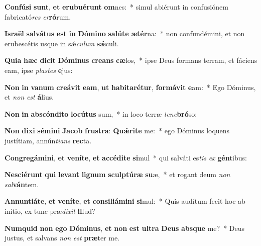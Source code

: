 \item \textbf{Con}\textbf{fú}\textbf{si} \textbf{sunt}, \textbf{et} \textbf{e}\textbf{ru}\textbf{bu}\textbf{é}\textbf{runt} \textbf{om}nes:~* simul abiérunt in confusiónem fabricató\textit{res} \textit{er}\textbf{ró}rum.
\item \textbf{Is}\textbf{ra}\textbf{ël} \textbf{sal}\textbf{vá}\textbf{tus} \textbf{est} \textbf{in} \textbf{Dó}\textbf{mi}\textbf{no} \textbf{sa}\textbf{lú}\textbf{te} \textbf{æ}\textbf{tér}na:~* non confundémini, et non erubescétis usque in sǽ\textit{cu}\textit{lum} \textbf{sǽ}culi.
\item \textbf{Qui}\textbf{a} \textbf{hæc} \textbf{di}\textbf{cit} \textbf{Dó}\textbf{mi}\textbf{nus} \textbf{cre}\textbf{ans} \textbf{cæ}los,~* ipse Deus formans terram, et fáciens eam, ipse \textit{plas}\textit{tes} \textbf{e}jus:
\item \textbf{Non} \textbf{in} \textbf{va}\textbf{num} \textbf{cre}\textbf{á}\textbf{vit} \textbf{e}\textbf{am}, \textbf{ut} \textbf{ha}\textbf{bi}\textbf{ta}\textbf{ré}\textbf{tur}, \textbf{for}\textbf{má}\textbf{vit} \textbf{e}am:~* Ego Dóminus, et \textit{non} \textit{est} \textbf{á}lius.
\item \textbf{Non} \textbf{in} \textbf{abs}\textbf{cón}\textbf{di}\textbf{to} \textbf{lo}\textbf{cú}\textbf{tus} sum,~* in loco terræ \textit{te}\textit{ne}\textbf{bró}so:
\item \textbf{Non} \textbf{di}\textbf{xi} \textbf{sé}\textbf{mi}\textbf{ni} \textbf{Ja}\textbf{cob} \textbf{frus}\textbf{tra}: \textbf{Quǽ}\textbf{ri}\textbf{te} me:~* ego Dóminus loquens justítiam, annún\textit{ti}\textit{ans} \textbf{rec}ta.
\item \textbf{Con}\textbf{gre}\textbf{gá}\textbf{mi}\textbf{ni}, \textbf{et} \textbf{ve}\textbf{ní}\textbf{te}, \textbf{et} \textbf{ac}\textbf{cé}\textbf{di}\textbf{te} \textbf{si}mul~* qui salváti es\textit{tis} \textit{ex} \textbf{gén}tibus:
\item \textbf{Ne}\textbf{sci}\textbf{é}\textbf{runt} \textbf{qui} \textbf{le}\textbf{vant} \textbf{li}\textbf{gnum} \textbf{sculp}\textbf{tú}\textbf{ræ} \textbf{su}æ,~* et rogant deum \textit{non} \textit{sal}\textbf{ván}tem.
\item \textbf{An}\textbf{nun}\textbf{ti}\textbf{á}\textbf{te}, \textbf{et} \textbf{ve}\textbf{ní}\textbf{te}, \textbf{et} \textbf{con}\textbf{si}\textbf{li}\textbf{á}\textbf{mi}\textbf{ni} \textbf{si}mul:~* Quis audítum fecit hoc ab inítio, ex tunc præ\textit{dí}\textit{xit} \textbf{il}lud?
\item \textbf{Num}\textbf{quid} \textbf{non} \textbf{e}\textbf{go} \textbf{Dó}\textbf{mi}\textbf{nus}, \textbf{et} \textbf{non} \textbf{est} \textbf{ul}\textbf{tra} \textbf{De}\textbf{us} \textbf{abs}\textbf{que} me?~* Deus justus, et salvans \textit{non} \textit{est} \textbf{præ}ter me.
